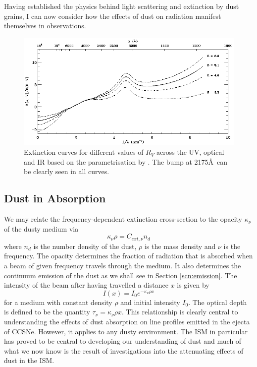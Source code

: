 Having established the physics behind light scattering and extinction by dust grains, I can now consider how the effects of dust on radiation manifest themselves in observations. 

\begin{figure}
\centering
\includegraphics[clip=true,scale=0.53,trim= 0 0 0 0]{chapters/chapter1/figs/extinction_curves2.png}
\caption{Extinction curves for different values of $R_V$ across the UV, optical and IR based on the parametrisation by \citet{Cardelli1989}.  The bump at 2175\AA\ can be clearly seen in all curves.}
\label{fig:ext_curve}
\end{figure}

\subsection{Dust in Absorption}
\label{scn:abs}
 

We may relate the frequency-dependent extinction cross-section to the opacity $\kappa_{\nu}$ of the dusty medium via
\begin{equation}
\kappa_{\nu} \rho = C_{ext,\nu} n_d
\end{equation}
\noindent where $n_d$ is the number density of the dust, $\rho$ is the mass density and $\nu$ is the frequency.  The opacity determines the fraction of radiation that is absorbed when a beam of given frequency travels through the medium.  It also determines the continuum emission of the dust as we shall see in Section \ref{scn:emission}.  The intensity of the beam after having travelled a distance $x$ is given by
\begin{equation}
I(x)=I_0 e^{-\kappa_{\nu} \rho x}
\end{equation}
\noindent  for a medium with constant density $\rho$ and initial intensity $I_0$.  The optical depth  is defined to be the quantity $\tau_{\nu}=\kappa_{\nu} \rho x$.  This relationship is clearly central to understanding the effects of dust absorption on line profiles emitted in the ejecta of CCSNe.  However, it applies to any dusty environment.  The ISM in particular has proved to be central to developing our understanding of dust and much of what we now know is the result of investigations into the attenuating effects of dust in the ISM.  
 
